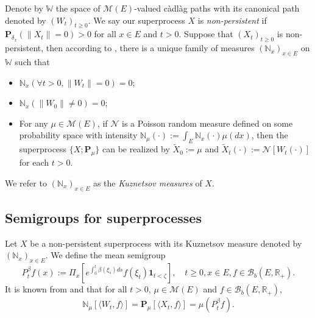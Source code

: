 \begin{comment}
    Notice that the branching mechanism $\psi$ can be extended into a map from $E \times \mathbb C_+$ to $\mathbb C$ using \eqref{eq: branching mechanism}.
    Define
\begin{equation}
    \psi'(x,z):= - \beta(x) + 2\alpha(x) z + \int_{(0,\infty)} (1-e^{-zy})y\pi(x,dy),
    \quad x\in E, z\in \mathbb C_+.
\end{equation}
    Then according to Lemma \ref{lem: extension lemma for branching mechanism}, for each $x \in E$, $z \mapsto \psi(x,z)$ is a holomorphic function on $\mathbb C_+^0$ with derivative $z \mapsto \psi'(x,z)$.
    Define $\psi_0(x,z) := \psi(x,z)+ \beta(x)z $ and $\psi'_0(x,z) := \psi'(x,z) + \beta(x)$.
\end{comment}

    Denote by $\mathbb W$ the space of $\mathcal M(E)$-valued c\`{a}dl\`{a}g paths with its canonical path denoted by $(W_t)_{t\geq 0}$.
    We say our superprocess $X$ is \emph{non-persistent} if $\mathbf P_{\delta_x}(\|X_t\|= 0) > 0$ for all $x\in E$ and $t> 0$.
    Suppose that $(X_t)_{t\geq 0}$ is non-persistent, then according to \cite[Section 8.4]{Li2011Measure-valued}, there is a unique family of measures $(\mathbb N_x)_{x\in E}$ on $\mathbb W$ such that
\begin{itemize}
\item
    $\mathbb N_x (\forall t > 0, \|W_t\|=0) =0$;
\item
    $\mathbb N_x(\|W_0 \|\neq 0) = 0$;
\item
    For any $\mu \in \mathcal M(E)$, if $\mathcal N$ is a Poisson random measure defined on some probability space
    with intensity $\mathbb N_\mu(\cdot):= \int_E \mathbb N_x(\cdot )\mu(dx)$,
    then the superprocess $\{X;\mathbf P_\mu\}$ can be realized by $\widetilde X_0 := \mu$ and $\widetilde X_t(\cdot) := \mathcal N[W_t(\cdot)]$ for each $t>0$.
\end{itemize}
    We refer to $(\mathbb N_x)_{x\in E}$ as the \emph{Kuznetsov measures} of $X$.
\subsection{{Semigroups for superprocesses}}
\label{sec: definition of vf}
    Let $X$ be a non-persistent superprocess with its Kuznetsov measure denoted by $(\mathbb N_x)_{x\in E}$.
    We define the mean semigroup
\begin{equation}
    P_t^{\beta} f(x)
    := \Pi_{x}[e^{\int_0^t \beta(\xi_s)ds}f(\xi_t) \mathbf 1_{t< \zeta}],
    \quad t\geq 0, x\in E, f\in \mathcal B_b(E,\mathbb R_+).
\end{equation}
    It is known from \cite[Proposition 2.27]{Li2011Measure-valued} and \cite[Theorem 2.7]{Kyprianou2014Fluctuations} that for all $t > 0$, $\mu \in \mathcal M(E)$ and $f\in \mathcal B_b(E,\mathbb R_+)$,
\begin{equation}
\label{eq: mean formula for superprocesses}
   \mathbb N_{\mu}[\langle W_t, f\rangle]    
   =\mathbf P_{\mu}[\langle X_t, f\rangle]
   =\mu(P^{\beta}_t f).
\end{equation}

